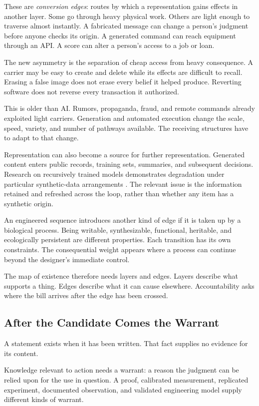 \documentclass[11pt,openany]{book}
\begin{document}
These are \emph{conversion edges}: routes by which a representation gains effects in another layer. Some go through heavy physical work. Others are light enough to traverse almost instantly. A fabricated message can change a person's judgment before anyone checks its origin. A generated command can reach equipment through an API. A score can alter a person's access to a job or loan.

The new asymmetry is the separation of cheap access from heavy consequence. A carrier may be easy to create and delete while its effects are difficult to recall. Erasing a false image does not erase every belief it helped produce. Reverting software does not reverse every transaction it authorized.

This is older than AI. Rumors, propaganda, fraud, and remote commands already exploited light carriers. Generation and automated execution change the scale, speed, variety, and number of pathways available. The receiving structures have to adapt to that change.

Representation can also become a source for further representation. Generated content enters public records, training sets, summaries, and subsequent decisions. Research on recursively trained models demonstrates degradation under particular synthetic-data arrangements \cite{shumailov2024ai}. The relevant issue is the information retained and refreshed across the loop, rather than whether any item has a synthetic origin.

An engineered sequence introduces another kind of edge if it is taken up by a biological process. Being writable, synthesizable, functional, heritable, and ecologically persistent are different properties. Each transition has its own constraints. The consequential weight appears where a process can continue beyond the designer's immediate control.

The map of existence therefore needs layers and edges. Layers describe what supports a thing. Edges describe what it can cause elsewhere. Accountability asks where the bill arrives after the edge has been crossed.

\subsection{After the Candidate Comes the Warrant}

A statement exists when it has been written. That fact supplies no evidence for its content.

Knowledge relevant to action needs a warrant: a reason the judgment can be relied upon for the use in question. A proof, calibrated measurement, replicated experiment, documented observation, and validated engineering model supply different kinds of warrant.
\end{document}

